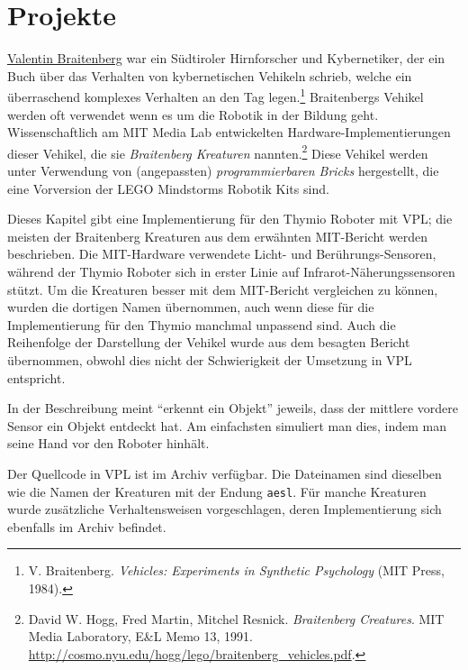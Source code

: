 \part{Projekte}

\label{ch.brait}


\href{https://de.wikipedia.org/wiki/Valentin_Braitenberg}{Valentin Braitenberg}
war ein Südtiroler Hirnforscher und Kybernetiker, der ein Buch über das Verhalten von kybernetischen Vehikeln schrieb, welche ein überraschend komplexes Verhalten an den Tag legen.\footnote{V. Braitenberg. \textit{Vehicles: Experiments in
Synthetic Psychology} (MIT Press, 1984).} Braitenbergs Vehikel werden oft verwendet wenn es um die Robotik in der Bildung geht. Wissenschaftlich am MIT Media
Lab entwickelten Hardware-Implementierungen dieser Vehikel, die sie 
\emph{Braitenberg Kreaturen} nannten.\footnote{David W. Hogg, Fred Martin,
Mitchel Resnick. \textit{Braitenberg Creatures}. MIT Media Laboratory,
E\&L Memo 13, 1991.
\href{http://cosmo.nyu.edu/hogg/lego/braitenberg_vehicles.pdf}{http://cosmo.nyu.edu/hogg/lego/braitenberg\_vehicles.pdf}.} Diese Vehikel werden unter Verwendung von (angepassten) \emph{programmierbaren Bricks} hergestellt, die eine Vorversion der LEGO Mindstorms Robotik Kits sind.

Dieses Kapitel gibt eine Implementierung für den Thymio Roboter mit VPL; die meisten der Braitenberg Kreaturen aus dem erwähnten MIT-Bericht werden beschrieben. Die 
MIT-Hardware verwendete Licht- und Berührungs-Sensoren, während der Thymio Roboter sich
in erster Linie auf Infrarot-Näherungssensoren stützt. Um die Kreaturen besser mit dem MIT-Bericht vergleichen zu können, wurden die dortigen Namen übernommen, auch wenn diese für die Implementierung für den Thymio manchmal unpassend sind. Auch die Reihenfolge der Darstellung der Vehikel wurde aus dem besagten Bericht übernommen, obwohl dies nicht der Schwierigkeit der Umsetzung in VPL entspricht.

In der Beschreibung meint ``erkennt ein Objekt'' jeweils, dass der mittlere vordere Sensor ein Objekt entdeckt hat. Am einfachsten simuliert man dies, indem man seine Hand vor den Roboter hinhält. 

Der Quellcode in \textsc{VPL} ist im Archiv verfügbar. Die Dateinamen sind dieselben wie die Namen der Kreaturen mit der Endung \texttt{\small aesl}. Für manche Kreaturen wurde zusätzliche Verhaltensweisen vorgeschlagen, deren Implementierung sich ebenfalls im Archiv befindet. 

